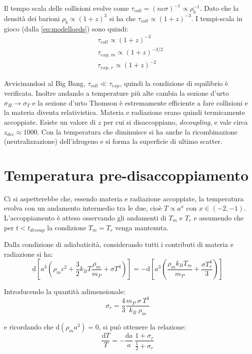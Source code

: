 Il tempo scala delle collisioni evolve come $\tau_{coll}=(nc\sigma)^{-1} \propto \rho_b^{-1}$. Dato che la densità dei barioni $\rho_b \propto (1+z)^{3}$ si ha che $\tau_{coll}\propto (1+z)^{-3}$. I tempi-scala in gioco (dalla \ref{eq:modelloeds}) sono quindi:
\begin{align*}
    & \tau_{coll} \propto (1+z)^{-3} \\
    & \tau_{exp, \, m} \propto (1+z)^{-3/2} \\
    & \tau_{exp, \, r} \propto (1+z)^{-2}
\end{align*}

Avvicinandosi al Big Bang, $\tau_{coll}\ll \tau_{exp}$, quindi la condizione di equilibrio è verificata. Inoltre andando a temperature più alte cambia la sezione d'urto $\sigma_H \rightarrow \sigma_T$ e la sezione d'urto Thomson è estremamente efficiente a fare collisioni e la materia diventa relativistica. Materia e radiazione erano quindi termicamente accoppiate. Esiste un valore di $z$ per cui si disaccoppiano, \textit{decoupling}, e vale circa $z_{dec}\approx 1000$. Con la temperatura che diminuisce si ha anche la ricombinazione (neutralizzazione) dell'idrogeno e si forma la superficie di ultimo scatter.

\section{Temperatura pre-disaccoppiamento}
Ci si aspetterebbe che, essendo materia e radiazione accoppiate, la temperatura evolva con un andamento intermedio tra le due, cioè $T\propto a^x$ con $x\in (-2, -1)$. L'accoppiamento è atteso osservando gli andamenti di $T_m$ e $T_r$ e assumendo che per $t<t_{decoup}$ la condizione $T_m = T_r$ venga mantenuta. 

Dalla condizione di adiabaticità, considerando tutti i contributi di materia e radiazione si ha:
\begin{equation}
    \mathrm{d} \left [ a^3    \left( \rho_m c^2 + \frac{3}{2}k_B T \frac{\rho_m}{m_P} + \sigma T^4 \right)  \right] = - \mathrm{d} \left [ a^3    \left( \frac{\rho_m k_B T_m}{m_P} + \frac{\sigma T_r^4}{3}  \right)  \right]
\end{equation}

Introducendo la quantità adimensionale:
\begin{equation}
    \sigma_{r}= \frac{4}{3} \frac{m_P ~\sigma ~T^3}{k_B ~\rho_m}
\end{equation}

e ricordando che $\mathrm{d} (\rho_m a^3) = 0$, si può ottenere la relazione:
\begin{equation}
\frac{ \mathrm{d}T}{T}= - \frac{ \mathrm{d}a}{a} \: \frac{1+\sigma_{r}}{\frac{1}{2} +\sigma_{r}}
\end{equation}

